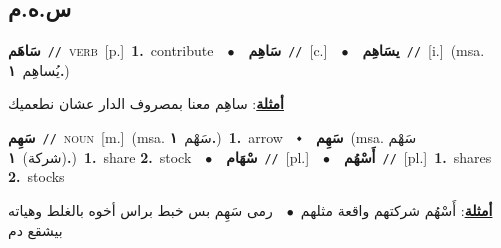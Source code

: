\documentclass[10pt,a4paper,twoside]{article} %
\begin{document}
\begin{multicols}{2}
\vspace{-3mm}
\subsection*{\color{blue}\foreignlanguage{arabic}{س.ه.م}\color{blue}{}} 

{\setlength\topsep{0pt}\textbf{\foreignlanguage{arabic}{سَاهَم}}\ {\color{gray}\texttt{//}\color{black}}\ \textsc{verb}\ [p.]\ \textbf{1.}~contribute\ \ $\bullet$\ \ \setlength\topsep{0pt}\textbf{\foreignlanguage{arabic}{سَاهِم}}\ {\color{gray}\texttt{//}\color{black}}\ [c.]\ \ $\bullet$\ \ \setlength\topsep{0pt}\textbf{\foreignlanguage{arabic}{يسَاهِم}}\ {\color{gray}\texttt{//}\color{black}}\ [i.]\ \color{gray}(msa. \foreignlanguage{arabic}{يُساهِم}~\foreignlanguage{arabic}{\textbf{١.}})\color{black}\  \begin{flushright}\color{gray}\foreignlanguage{arabic}{\textbf{\underline{\foreignlanguage{arabic}{أمثلة}}}: ساهِم معنا بمصروف الدار عشان نطعميك}\end{flushright}\color{black}} \vspace{2mm}

{\setlength\topsep{0pt}\textbf{\foreignlanguage{arabic}{سَهِم}}\ {\color{gray}\texttt{//}\color{black}}\ \textsc{noun}\ [m.]\ \color{gray}(msa. \foreignlanguage{arabic}{سَهْم}~\foreignlanguage{arabic}{\textbf{١.}})\color{black}\ \textbf{1.}~arrow\ \ $\smblkdiamond$\ \ \setlength\topsep{0pt}\textbf{\foreignlanguage{arabic}{سَهِم}}\ \color{gray}(msa. \foreignlanguage{arabic}{سَهْم (شركة)}~\foreignlanguage{arabic}{\textbf{١.}})\color{black}\ \textbf{1.}~share  \textbf{2.}~stock\ \ $\bullet$\ \ \setlength\topsep{0pt}\textbf{\foreignlanguage{arabic}{سْهَام}}\ {\color{gray}\texttt{//}\color{black}}\ [pl.]\ \ $\bullet$\ \ \setlength\topsep{0pt}\textbf{\foreignlanguage{arabic}{أَسْهُم}}\ {\color{gray}\texttt{//}\color{black}}\ [pl.]\ \textbf{1.}~shares  \textbf{2.}~stocks\  \begin{flushright}\color{gray}\foreignlanguage{arabic}{\textbf{\underline{\foreignlanguage{arabic}{أمثلة}}}: أَسْهُم شركتهم واقعة مثلهم\ $\bullet$\ \  رمى سَهِم بس خبط براس أخوه بالغلط وهياته بيشقع دم}\end{flushright}\color{black}} \vspace{2mm}


\end{multicols}
\end{document}
